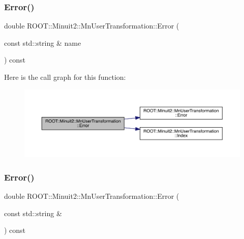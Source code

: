 \subsubsection{\texorpdfstring{Error()}{Error()}\hspace{0.1cm}{\footnotesize\ttfamily [3/4]}}
{\footnotesize\ttfamily double R\+O\+O\+T\+::\+Minuit2\+::\+Mn\+User\+Transformation\+::\+Error (\begin{DoxyParamCaption}\item[{const std\+::string \&}]{name }\end{DoxyParamCaption}) const}

Here is the call graph for this function\+:\nopagebreak
\begin{figure}[H]
\begin{center}
\leavevmode
\includegraphics[width=350pt]{d9/d98/classROOT_1_1Minuit2_1_1MnUserTransformation_a176d46b9b3b58479a92145e7f9293143_cgraph}
\end{center}
\end{figure}
\mbox{\label{classROOT_1_1Minuit2_1_1MnUserTransformation_a176d46b9b3b58479a92145e7f9293143}} 
\subsubsection{\texorpdfstring{Error()}{Error()}\hspace{0.1cm}{\footnotesize\ttfamily [4/4]}}
{\footnotesize\ttfamily double R\+O\+O\+T\+::\+Minuit2\+::\+Mn\+User\+Transformation\+::\+Error (\begin{DoxyParamCaption}\item[{const std\+::string \&}]{ }\end{DoxyParamCaption}) const}

\mbox{\label{classROOT_1_1Minuit2_1_1MnUserTransformation_a7920b97096b486b27a4a020894677500}} 
